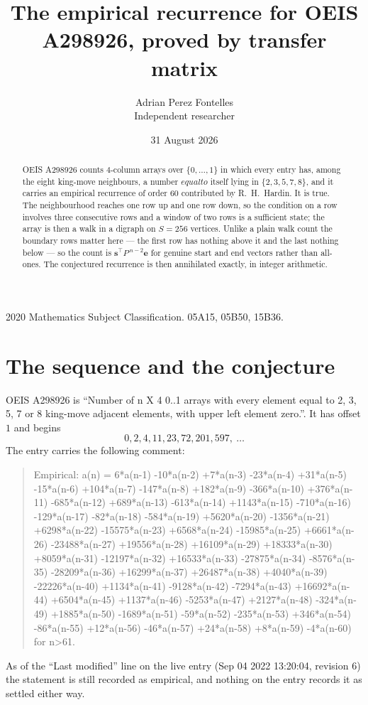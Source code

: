 \documentclass[11pt,a4paper]{article}
\title{The empirical recurrence for OEIS A298926, proved by transfer matrix}
\author{Adrian Perez Fontelles\\ \small Independent researcher}
\date{31 August 2026}
\theoremstyle{plain}
\theoremstyle{definition}
\begin{document}
\maketitle

\begin{abstract}
OEIS A298926 counts $4$-column arrays over $\{0,\dots,1\}$ in which every entry has,
among the eight king-move neighbours, a number $equal to$ itself lying in $\{2,3,5,7,8\}$, and it carries an empirical
recurrence of order $60$ contributed by R.~H.~Hardin. It is true. The neighbourhood
reaches one row up and one row down, so the condition on a row involves three consecutive
rows and a window of two rows is a sufficient state; the array is then a walk in a digraph
on $S=256$ vertices. Unlike a plain walk count the boundary rows matter here --- the first
row has nothing above it and the last nothing below --- so the count is
$\mathbf{s}^{\!\top}P^{\,n-2}\mathbf{e}$ for genuine start and end vectors rather than
all-ones. The conjectured recurrence is then annihilated exactly, in integer arithmetic.
\end{abstract}

\noindent\small 2020 Mathematics Subject Classification. 05A15, 05B50, 15B36.\normalsize

\section{The sequence and the conjecture}

OEIS A298926 is ``Number of n X 4 0..1 arrays with every element equal to 2, 3, 5, 7 or 8 king-move adjacent elements, with upper left element zero.''. It has offset
$1$ and begins
\[
0, 2, 4, 11, 23, 72, 201, 597,\ \dots
\]
The entry carries the following comment:
\begin{quote}\small
Empirical: a(n) = 6*a(n-1) -10*a(n-2) +7*a(n-3) -23*a(n-4) +31*a(n-5) -15*a(n-6) +104*a(n-7) -147*a(n-8) +182*a(n-9) -366*a(n-10) +376*a(n-11) -685*a(n-12) +689*a(n-13) -613*a(n-14) +1143*a(n-15) -710*a(n-16) -129*a(n-17) -82*a(n-18) -584*a(n-19) +5620*a(n-20) -1356*a(n-21) +6298*a(n-22) -15575*a(n-23) +6568*a(n-24) -15985*a(n-25) +6661*a(n-26) -23488*a(n-27) +19556*a(n-28) +16109*a(n-29) +18333*a(n-30) +8059*a(n-31) -12197*a(n-32) +16533*a(n-33) -27875*a(n-34) -8576*a(n-35) -28209*a(n-36) +16299*a(n-37) +26487*a(n-38) +4040*a(n-39) -22226*a(n-40) +1134*a(n-41) -9128*a(n-42) -7294*a(n-43) +16692*a(n-44) +6504*a(n-45) +1137*a(n-46) -5253*a(n-47) +2127*a(n-48) -324*a(n-49) +1885*a(n-50) -1689*a(n-51) -59*a(n-52) -235*a(n-53) +346*a(n-54) -86*a(n-55) +12*a(n-56) -46*a(n-57) +24*a(n-58) +8*a(n-59) -4*a(n-60) for n>61.
\end{quote}
As of the ``Last modified'' line on the live entry (Sep 04 2022 13:20:04, revision
6) the statement is still recorded as empirical, and nothing on the entry
records it as settled either way.
\end{document}
